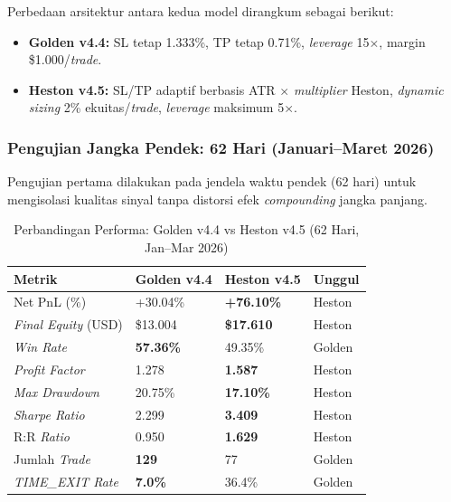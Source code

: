 Perbedaan arsitektur antara kedua model dirangkum sebagai berikut:
\begin{itemize}
    \item \textbf{Golden v4.4:} SL tetap 1.333\%, TP tetap 0.71\%, \textit{leverage} 15$\times$, margin \$1.000/\textit{trade}.
    \item \textbf{Heston v4.5:} SL/TP adaptif berbasis ATR $\times$ \textit{multiplier} Heston, \textit{dynamic sizing} 2\% ekuitas/\textit{trade}, \textit{leverage} maksimum 5$\times$.
\end{itemize}

\subsubsection{Pengujian Jangka Pendek: 62 Hari (Januari--Maret 2026)}

Pengujian pertama dilakukan pada jendela waktu pendek (62 hari) untuk mengisolasi kualitas sinyal tanpa distorsi efek \textit{compounding} jangka panjang.

\begin{table}[h!]
\centering
\caption{Perbandingan Performa: Golden v4.4 vs Heston v4.5 (62 Hari, Jan--Mar 2026)}
\label{table:evo_62d}
\begin{tabular}{@{}llll@{}}
\toprule
\textbf{Metrik}         & \textbf{Golden v4.4} & \textbf{Heston v4.5}  & \textbf{Unggul} \\ \midrule
Net PnL (\%)            & +30.04\%             & \textbf{+76.10\%}     & Heston \\
\textit{Final Equity} (USD) & \$13.004         & \textbf{\$17.610}     & Heston \\
\textit{Win Rate}       & \textbf{57.36\%}     & 49.35\%               & Golden \\
\textit{Profit Factor}  & 1.278                & \textbf{1.587}        & Heston \\
\textit{Max Drawdown}   & 20.75\%              & \textbf{17.10\%}      & Heston \\
\textit{Sharpe Ratio}   & 2.299                & \textbf{3.409}        & Heston \\
R:R \textit{Ratio}      & 0.950                & \textbf{1.629}        & Heston \\
Jumlah \textit{Trade}   & \textbf{129}         & 77                    & Golden \\
\textit{TIME\_EXIT Rate}& \textbf{7.0\%}       & 36.4\%                & Golden \\
\bottomrule
\end{tabular}
\end{table}

